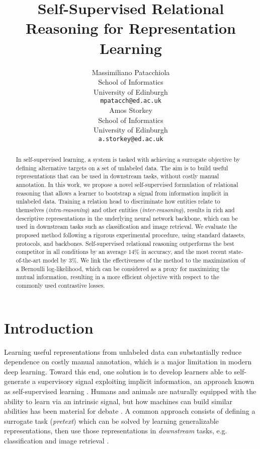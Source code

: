 \documentclass{article}
\title{Self-Supervised Relational Reasoning for Representation Learning}
\author{
  Massimiliano Patacchiola\\
  School of Informatics\\
  University of Edinburgh\\
  \texttt{mpatacch@ed.ac.uk} \\
  \And
  Amos Storkey\\
  School of Informatics\\
  University of Edinburgh\\
  \texttt{a.storkey@ed.ac.uk} \\
}
\begin{document}
\maketitle

\begin{abstract}
  In self-supervised learning, a system is tasked with achieving a surrogate objective by defining alternative targets on a set of unlabeled data. The aim is to build useful representations that can be used in downstream tasks, without costly manual annotation. In this work, we propose a novel self-supervised formulation of relational reasoning that allows a learner to bootstrap a signal from information implicit in unlabeled data. 
  Training a relation head to discriminate how entities relate to themselves (\emph{intra-reasoning}) and other entities (\emph{inter-reasoning}), results in rich and descriptive representations in the underlying neural network backbone, which can be used in downstream tasks such as classification and image retrieval. We evaluate the proposed method following a rigorous experimental procedure, using standard datasets, protocols, and backbones. Self-supervised relational reasoning outperforms the best competitor in all conditions by an average 14\% in accuracy, and the most recent state-of-the-art model by 3\%. We link the effectiveness of the method to the maximization of a Bernoulli log-likelihood, which can be considered as a proxy for maximizing the mutual information, resulting in a more efficient objective with respect to the commonly used contrastive losses.
\end{abstract}

\section{Introduction}

Learning useful representations from unlabeled data can substantially reduce dependence on costly manual annotation, which is a major limitation in modern deep learning. Toward this end, one solution is to develop learners able to self-generate a supervisory signal exploiting implicit information, an approach known as self-supervised learning \citep{schmidhuber1987evolutionary,schmidhuber1990making}.
Humans and animals are naturally equipped with the ability to learn via an intrinsic signal, but how machines can build similar abilities has been material for debate \citep{lake2017building}.
A common approach consists of defining a surrogate task (\emph{pretext}) which can be solved by learning generalizable representations, then use those representations in \emph{downstream} tasks, e.g. classification and image retrieval \citep{jing2020self}.
\end{document}
